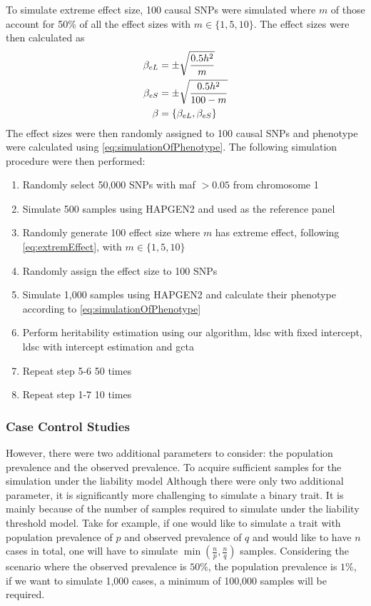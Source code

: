 		To simulate extreme effect size, 100 causal \glspl{SNP} were simulated where $m$ of those account for 50\% of all the effect sizes with $m\in\{1,5,10\}$.
		The effect sizes were then calculated as
		\begin{align}
		\beta_{eL} &= \pm\sqrt{\frac{0.5h^2}{m}} \notag\\
		\beta_{eS} &= \pm\sqrt{\frac{0.5h^2}{100-m}} \notag\\
		\beta &= \{\beta_{eL}, \beta_{eS}\}
		\label{eq:extremEffect}
		\end{align}
		The effect sizes were then randomly assigned to 100 causal \glspl{SNP} and phenotype were calculated using \cref{eq:simulationOfPhenotype}.
		The following simulation procedure were then performed:
		\begin{enumerate}
			\item Randomly select 50,000 \glspl{SNP} with \gls{maf} $>0.05$ from chromosome 1
			\item Simulate 500 samples using HAPGEN2 and used as the reference panel
			\item Randomly generate 100 effect size where $m$ has extreme effect, following \cref{eq:extremEffect}, with $m\in\{1,5,10\}$
			\item Randomly assign the effect size to 100 \glspl{SNP}
			\item Simulate 1,000 samples using HAPGEN2 and calculate their phenotype according to \cref{eq:simulationOfPhenotype}
			\item Perform heritability estimation using our algorithm, \gls{ldsc} with fixed intercept, \gls{ldsc} with intercept estimation and \gls{gcta}
			\item Repeat step 5-6 50 times
			\item Repeat step 1-7 10 times
		\end{enumerate}
		
		\subsubsection{Case Control Studies}
		However, there were two additional parameters to consider: the population prevalence and the observed prevalence.
		To acquire sufficient samples for the simulation under the liability model
		Although there were only two additional parameter, it is significantly more challenging to simulate a binary trait.
		It is mainly because of the number of samples required to simulate under the liability threshold model.
		Take for example, if one would like to simulate a trait with population prevalence of $p$ and observed prevalence of $q$ and would like to have $n$ cases in total, one will have to simulate $\min(\frac{n}{p}, \frac{n}{q})$ samples.
		Considering the scenario where the observed prevalence is $50\%$, the population prevalence is $1\%$, if we want to simulate 1,000 cases, a minimum of 100,000 samples will be required.
		
